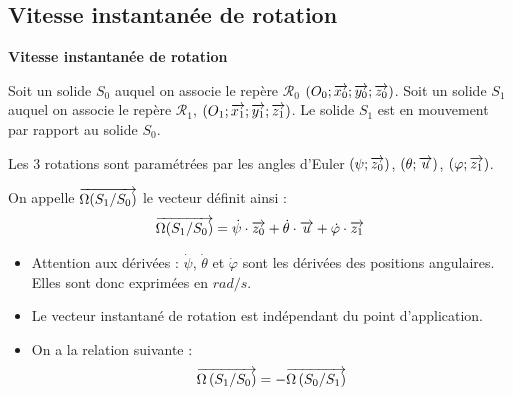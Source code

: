 \documentclass[11pt,oneside]{article}
\begin{document}
\subsection{Vitesse instantanée de rotation}
\begin{defi}
\textbf{Vitesse instantanée de rotation}

Soit un solide $S_0$ auquel on associe le repère $\mathcal{R}_0$ $\left(O_0;\overrightarrow{x_0};\overrightarrow{y_0};\overrightarrow{z_0} \right)$.  Soit un solide $S_1$ auquel on associe le repère $\mathcal{R}_1$,  $\left(O_1;\overrightarrow{x_1};\overrightarrow{y_1};\overrightarrow{z_1} \right)$. Le solide $S_1$ est en mouvement par rapport au solide $S_0$. 

Les 3 rotations sont paramétrées par les angles d'Euler $(\psi;\overrightarrow{z_0})$, $(\theta;\overrightarrow{u})$, $(\varphi;\overrightarrow{z_1})$.

On appelle $\overrightarrow{\Omega(S_1/S_0)}$ le vecteur définit ainsi :
$$
\overrightarrow{\Omega(S_1/S_0)} = \dot{\psi}\cdot\overrightarrow{z_0}+\dot{\theta}\cdot\overrightarrow{u}+\dot{\varphi}\cdot\overrightarrow{z_1}
$$
\end{defi}

\begin{rem}
\begin{itemize}
\item Attention aux dérivées : $\dot{\psi}$, $\dot{\theta}$ et $\dot{\varphi}$ sont les dérivées des positions angulaires. Elles sont donc exprimées en $rad/s$.
\item Le vecteur instantané de rotation est indépendant du point d'application.
\item On a la relation suivante :
$$\overrightarrow{\Omega\left( {S_1}/{S_0}\right)} = -\overrightarrow{\Omega\left( {S_0}/{S_1}\right)}$$
\end{itemize}
\end{rem}
\end{document}
